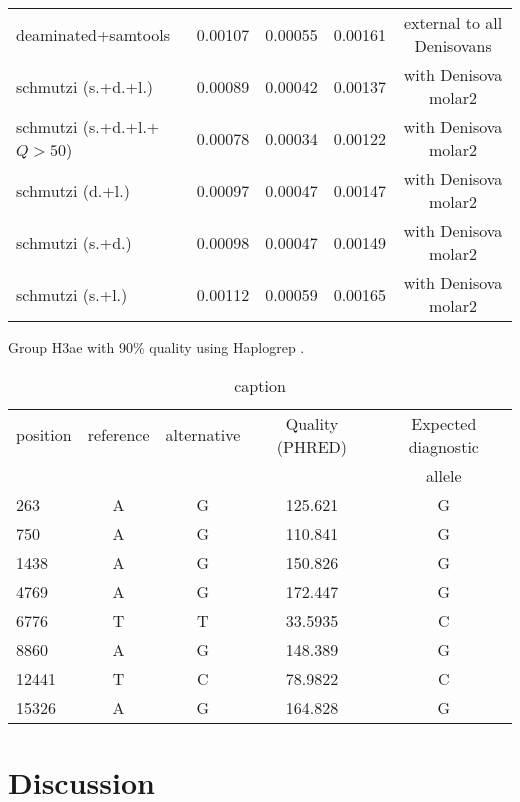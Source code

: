 \documentclass[a4paper,12pt]{article}
\begin{document}
\begin{itemize}
\begin{itemize}
{\begin{table}[H]
\begin{tabular}{l|cccc}
\hline
deaminated+samtools                            & 0.00107           & 0.00055     & 0.00161     & external to all Denisovans \\ 
schmutzi (s.+d.+l.)                            & 0.00089           & 0.00042     & 0.00137     & with Denisova molar2 \\ 
schmutzi (s.+d.+l.+$Q>50$)                     & 0.00078           & 0.00034     & 0.00122     & with Denisova molar2 \\ 
schmutzi (d.+l.)                               & 0.00097           & 0.00047     & 0.00147     & with Denisova molar2 \\ 
schmutzi (s.+d.)                               & 0.00098           & 0.00047     & 0.00149     & with Denisova molar2 \\ 
schmutzi (s.+l.)                               & 0.00112           & 0.00059     & 0.00165     & with Denisova molar2 \\ 
\hline
\end{tabular}
\label{tab:branchlength}
\end{table}
}

Group H3ae with 90\% quality using Haplogrep \cite{kloss2011haplogrep}.



\begin{table}[H]
\caption{caption}
\centering
\begin{tabular}{l|cccc}
position & reference & alternative & Quality (PHRED) & Expected diagnostic \\
         &           &             &                 &  allele \\
\hline
263 & A & G & 125.621 & G \\ 
750 & A & G & 110.841 & G \\ 
1438 & A & G & 150.826 & G \\ 
4769 & A & G & 172.447 & G \\ 
6776 & T & T & 33.5935 & C \\ 
8860 & A & G & 148.389 & G \\ 
12441 & T & C & 78.9822 & C \\ 
15326 & A & G & 164.828 & G \\ 
\hline
\end{tabular}
\label{tab:diagpos}
\end{table}

\clearpage

\section{Discussion}


\end{itemize}
\end{itemize}
\end{document}
